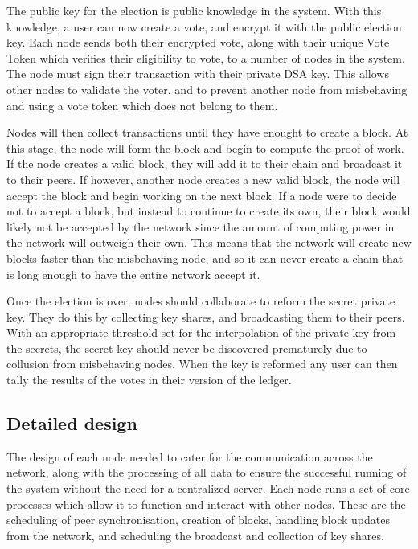 \documentclass[a4paper,12pt]{article}
\begin{document}
The public key for the election is public knowledge in the system. With this knowledge, a user can now create a vote, and encrypt it with the public election key. Each node sends both their encrypted vote, along with their unique Vote Token which verifies their eligibility to vote, to a number of nodes in the system. The node must sign their transaction with their private DSA key. This allows other nodes to validate the voter, and to prevent another node from misbehaving and using a vote token which does not belong to them.

Nodes will then collect transactions until they have enought to create a block. At this stage, the node will form the block and begin to compute the proof of work. If the node creates a valid block, they will add it to their chain and broadcast it to their peers. If however, another node creates a new valid block, the node will accept the block and begin working on the next block. If a node were to decide not to accept a block, but instead to continue to create its own, their block would likely not be accepted by the network since the amount of computing power in the network will outweigh their own. This means that the network will create new blocks faster than the misbehaving node, and so it can never create a chain that is long enough to have the entire network accept it.

Once the election is over, nodes should collaborate to reform the secret private key. They do this by collecting key shares, and broadcasting them to their peers. With an appropriate threshold set for the interpolation of the private key from the secrets, the secret key should never be discovered prematurely due to collusion from misbehaving nodes. When the key is reformed any user can then tally the results of the votes in their version of the ledger.

\subsection{Detailed design}
The design of each node needed to cater for the communication across the network, along with the processing of all data to ensure the successful running of the system without the need for a centralized server. Each node runs a set of core processes which allow it to function and interact with other nodes. These are the scheduling of peer synchronisation, creation of blocks, handling block updates from the network, and scheduling the broadcast and collection of key shares.
\end{document}
